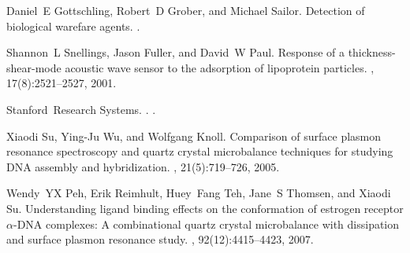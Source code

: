 \documentclass[floatfix,superscriptaddress,a4paper,twocolumn]{revtex4-1}
\begin{document}
\begin{thebibliography}{10}
Daniel~E Gottschling, Robert~D Grober, and Michael Sailor.
\newblock Detection of biological warefare agents.
.

Shannon~L Snellings, Jason Fuller, and David~W Paul.
\newblock Response of a thickness-shear-mode acoustic wave sensor to the
  adsorption of lipoprotein particles.
, 17(8):2521--2527, 2001.

Stanford~Research Systems.
.
.

Xiaodi Su, Ying-Ju Wu, and Wolfgang Knoll.
\newblock Comparison of surface plasmon resonance spectroscopy and quartz
  crystal microbalance techniques for studying {DNA} assembly and
  hybridization.
, 21(5):719--726, 2005.

Wendy~YX Peh, Erik Reimhult, Huey~Fang Teh, Jane~S Thomsen, and Xiaodi Su.
\newblock Understanding ligand binding effects on the conformation of estrogen
  receptor $\alpha$-{DNA} complexes: A combinational quartz crystal
  microbalance with dissipation and surface plasmon resonance study.
, 92(12):4415--4423, 2007.

\end{thebibliography}

\end{document}
